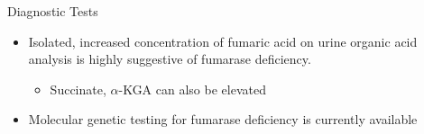 \documentclass[presentation, smaller]{beamer}
\begin{document}
\begin{frame}[label={sec:orgb8c361a}]{Diagnostic Tests}
\begin{itemize}
\item Isolated, increased concentration of fumaric acid on urine organic
acid analysis is highly suggestive of fumarase deficiency.
\begin{itemize}
\item Succinate, \(\alpha\)-KGA can also be elevated
\end{itemize}
\item Molecular genetic testing for fumarase deficiency is currently available
\end{itemize}
\end{frame}
\end{document}

